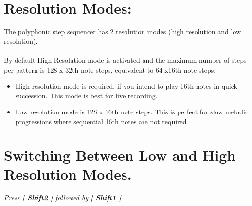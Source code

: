 \section{Resolution Modes:}
The polyphonic step sequencer has 2 resolution modes (high resolution and low resolution).\\
\\
By default High Resolution mode is activated and the maximum number of steps per pattern is 128 x 32th note steps, equivalent to 64 x16th note steps.
\begin{itemize}
\item High resolution mode is required, if you intend to play 16th notes in quick succession. This mode is best for live recording.
\item Low resolution mode is 128 x 16th note steps. This is perfect for slow melodic progressions where sequential 16th notes are not required
\end{itemize}
\section{Switching Between Low and High Resolution Modes.}
\textit{Press \textbf{[ Shift2 ]} followed by \textbf{[ Shift1 ]}}
